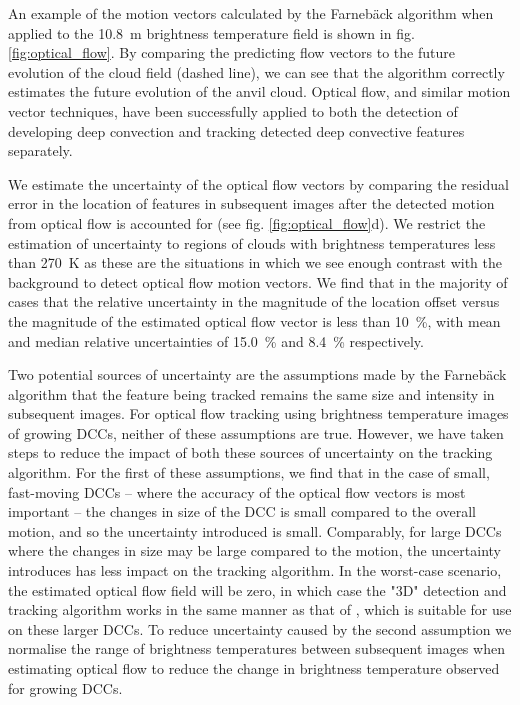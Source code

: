 An example of the motion vectors calculated by the Farnebäck algorithm when applied to the 10.8~\textmu m brightness temperature field is shown in fig. \ref{fig:optical_flow}.
By comparing the predicting flow vectors to the future evolution of the cloud field (dashed line), we can see that the algorithm correctly estimates the future evolution of the anvil cloud.
Optical flow, and similar motion vector techniques, have been successfully applied to both the detection of developing deep convection \citep{zinner_cb-tram:_2008, zhang_locating_2014} and tracking detected deep convective features \citep{senf_size-resolved_2018} separately.

We estimate the uncertainty of the optical flow vectors by comparing the residual error in the location of features in subsequent images after the detected motion from optical flow is accounted for (see fig. \ref{fig:optical_flow}d).
We restrict the estimation of uncertainty to regions of clouds with brightness temperatures less than 270~K as these are the situations in which we see enough contrast with the background to detect optical flow motion vectors.
We find that in the majority of cases that the relative uncertainty in the magnitude of the location offset versus the magnitude of the estimated optical flow vector is less than 10~\%, with mean and median relative uncertainties of 15.0~\% and 8.4~\% respectively.

Two potential sources of uncertainty are the assumptions made by the Farnebäck algorithm that the feature being tracked remains the same size and intensity in subsequent images.
For optical flow tracking using brightness temperature images of growing DCCs, neither of these assumptions are true.
However, we have taken steps to reduce the impact of both these sources of uncertainty on the tracking algorithm.
For the first of these assumptions, we find that in the case of small, fast-moving DCCs -- where the accuracy of the optical flow vectors is most important -- the changes in size of the DCC is small compared to the overall motion, and so the uncertainty introduced is small.
Comparably, for large DCCs where the changes in size may be large compared to the motion, the uncertainty introduces has less impact on the tracking algorithm.
In the worst-case scenario, the estimated optical flow field will be zero, in which case the "3D" detection and tracking algorithm works in the same manner as that of \citet{fiolleau_algorithm_2013}, which is suitable for use on these larger DCCs.
To reduce uncertainty caused by the second assumption we normalise the range of brightness temperatures between subsequent images when estimating optical flow to reduce the change in brightness temperature observed for growing DCCs.


